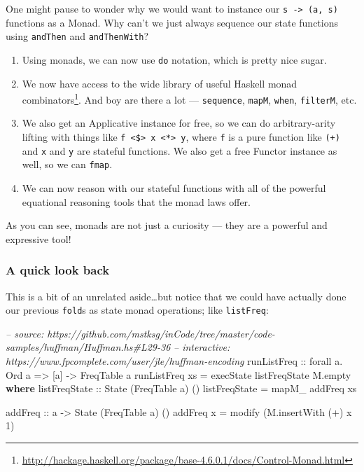 \documentclass[]{article}
\newenvironment{Shaded}{}{}
\newcommand{\KeywordTok}[1]{\textcolor[rgb]{0.00,0.44,0.13}{\textbf{#1}}}
\newcommand{\DataTypeTok}[1]{\textcolor[rgb]{0.56,0.13,0.00}{#1}}
\newcommand{\DecValTok}[1]{\textcolor[rgb]{0.25,0.63,0.44}{#1}}
\newcommand{\CommentTok}[1]{\textcolor[rgb]{0.38,0.63,0.69}{\textit{#1}}}
\newcommand{\OtherTok}[1]{\textcolor[rgb]{0.00,0.44,0.13}{#1}}
\newcommand{\FunctionTok}[1]{\textcolor[rgb]{0.02,0.16,0.49}{#1}}
\newcommand{\NormalTok}[1]{#1}
\renewcommand{\href}[2]{#2\footnote{\url{#1}}}
\begin{document}
One might pause to wonder why we would want to instance our
\texttt{s\ -\textgreater{}\ (a,\ s)} functions as a Monad. Why can't we just
always sequence our state functions using \texttt{andThen} and
\texttt{andThenWith}?

\begin{enumerate}
\def\labelenumi{\arabic{enumi}.}
\item
  Using monads, we can now use \texttt{do} notation, which is pretty nice sugar.
\item
  We now have access to the wide library of useful Haskell
  \href{http://hackage.haskell.org/package/base-4.6.0.1/docs/Control-Monad.html}{monad
  combinators}. And boy are there a lot --- \texttt{sequence}, \texttt{mapM},
  \texttt{when}, \texttt{filterM}, etc.
\item
  We also get an Applicative instance for free, so we can do arbitrary-arity
  lifting with things like
  \texttt{f\ \textless{}\$\textgreater{}\ x\ \textless{}*\textgreater{}\ y},
  where \texttt{f} is a pure function like \texttt{(+)} and \texttt{x} and
  \texttt{y} are stateful functions. We also get a free Functor instance as
  well, so we can \texttt{fmap}.
\item
  We can now reason with our stateful functions with all of the powerful
  equational reasoning tools that the monad laws offer.
\end{enumerate}

As you can see, monads are not just a curiosity --- they are a powerful and
expressive tool!

\subsubsection{A quick look back}\label{a-quick-look-back}

This is a bit of an unrelated aside\ldots{}but notice that we could have
actually done our previous \texttt{fold}s as state monad operations; like
\texttt{listFreq}:

\begin{Shaded}
\begin{Highlighting}[]
\CommentTok{-- source: https://github.com/mstksg/inCode/tree/master/code-samples/huffman/Huffman.hs#L29-36}
\CommentTok{-- interactive: https://www.fpcomplete.com/user/jle/huffman-encoding}
\OtherTok{runListFreq ::}\NormalTok{ forall a}\FunctionTok{.} \DataTypeTok{Ord}\NormalTok{ a }\OtherTok{=>}\NormalTok{ [a] }\OtherTok{->} \DataTypeTok{FreqTable}\NormalTok{ a}
\NormalTok{runListFreq xs }\FunctionTok{=}\NormalTok{ execState listFreqState M.empty}
  \KeywordTok{where}
\OtherTok{    listFreqState ::} \DataTypeTok{State}\NormalTok{ (}\DataTypeTok{FreqTable}\NormalTok{ a) ()}
\NormalTok{    listFreqState }\FunctionTok{=}\NormalTok{ mapM_ addFreq xs}

\OtherTok{    addFreq ::}\NormalTok{ a }\OtherTok{->} \DataTypeTok{State}\NormalTok{ (}\DataTypeTok{FreqTable}\NormalTok{ a) ()}
\NormalTok{    addFreq x }\FunctionTok{=}\NormalTok{ modify (M.insertWith (}\FunctionTok{+}\NormalTok{) x }\DecValTok{1}\NormalTok{)}
\end{Highlighting}
\end{Shaded}
\end{document}
